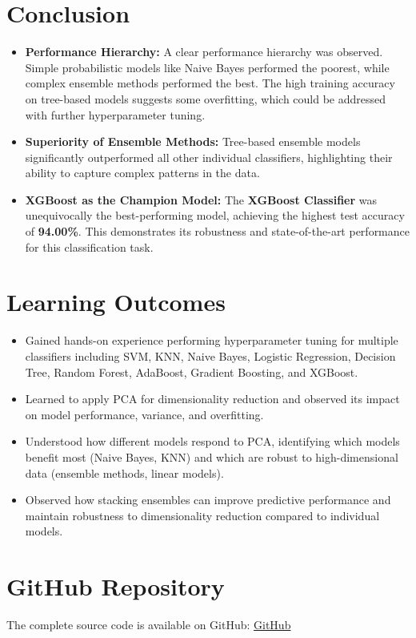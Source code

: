 \documentclass[12pt]{article}
\begin{document}
\section{Conclusion}
\begin{itemize}
    \item \textbf{Performance Hierarchy:} A clear performance hierarchy was observed. Simple probabilistic models like Naive Bayes performed the poorest, while complex ensemble methods performed the best. The high training accuracy on tree-based models suggests some overfitting, which could be addressed with further hyperparameter tuning.
    \item \textbf{Superiority of Ensemble Methods:} Tree-based ensemble models significantly outperformed all other individual classifiers, highlighting their ability to capture complex patterns in the data.
    \item \textbf{XGBoost as the Champion Model:} The \textbf{XGBoost Classifier} was unequivocally the best-performing model, achieving the highest test accuracy of \textbf{94.00\%}. This demonstrates its robustness and state-of-the-art performance for this classification task.
\end{itemize}

\section{Learning Outcomes}
\begin{itemize}
    \item Gained hands-on experience performing hyperparameter tuning for multiple classifiers including SVM, KNN, Naive Bayes, Logistic Regression, Decision Tree, Random Forest, AdaBoost, Gradient Boosting, and XGBoost.
    \item Learned to apply PCA for dimensionality reduction and observed its impact on model performance, variance, and overfitting.
    \item Understood how different models respond to PCA, identifying which models benefit most (Naive Bayes, KNN) and which are robust to high-dimensional data (ensemble methods, linear models).
    \item Observed how stacking ensembles can improve predictive performance and maintain robustness to dimensionality reduction compared to individual models.
\end{itemize}

\section*{GitHub Repository}
The complete source code is available on GitHub:
\href{https://github.com/yuvashreeph/Machine-Learning/tree/main/Assignment6}{GitHub}
\end{document}
